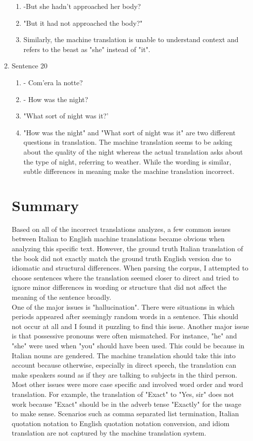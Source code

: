 \documentclass{article}
\begin{document}
\begin{enumerate}
\begin{enumerate}[label=(\alph*)]
        \item -But she hadn't approached her body?
        \item    "But it had not approached the body?"
        \item Similarly, the machine translation is unable to understand context and refers to the beast as "she"
            instead of "it".
    \end{enumerate}   
    \item Sentence 20
    \begin{enumerate}[label=(\alph*)]
        \item     - Com'era la notte?
        \item - How was the night?
        \item    "What sort of night was it?'
        \item "How was the night" and "What sort of night was it" are two different questions in translation. 
            The machine translation seems to be asking about the quality of the night whereas the actual translation 
            asks about the type of night, referring to weather. While the wording is similar, subtle differences in 
            meaning make the machine translation incorrect.
    \end{enumerate}   
\section{Summary}
Based on all of the incorrect translations analyzes, a few common issues between 
Italian to English machine translations became obvious when analyzing this specific text. 
However, the ground truth Italian translation of the book did not exactly match the ground 
truth English version due to idiomatic and structural differences. When parsing the corpus, 
I attempted to choose sentences where the translation seemed closer to direct and tried to 
ignore minor differences in wording or structure that did not affect the meaning of the sentence
broadly. \\


One of the major issues is "hallucination". There were situations in which periods appeared
after seemingly random words in a sentence. This should not occur at all and I found it puzzling
to find this issue. Another major issue is that possessive pronouns were often mismatched. For 
instance, "he" and "she" were used when "you" should have been used. This could be because in Italian
nouns are gendered. The machine translation should take this into account because otherwise, 
especially in direct speech, the translation can make speakers sound as if they are talking 
to subjects in the third person. Most other issues were more case specific and involved 
word order and word translation. For example, the translation of "Exact" to "Yes, sir" does 
not work because "Exact" should be in the adverb tense "Exactly" for the usage to make sense.
Scenarios such as comma separated list termination, Italian quotation notation
to English quotation notation conversion, and idiom translation are not captured by the machine 
translation system. \\


\end{enumerate}
\end{document}
